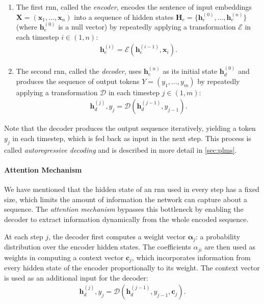 {\begin{enumerate}
    \item The first \ac{rnn}, called the \emph{encoder}, encodes the sentence of input embeddings $\mathbf{X}= (\mathbf{x}_1, \ldots, \mathbf{x}_n)$ into a sequence of hidden states $\mathbf{H}_e = \{\mathbf{h}_e^{(0)}, \ldots, \mathbf{h}_e^{(n)}\}$ (where $\mathbf{h}_e^{(0)}$ is a null vector) by repeatedly applying a transformation $\mathcal{E}$ in each timestep $i\in(1,n)$:
          \begin{align}
              \mathbf{h}_e^{(i)} = \mathcal{E}(\mathbf{h}_e^{(i-1)}, \mathbf{x}_i).
          \end{align}
    \item The second \ac{rnn}, called the \emph{decoder}, uses $\mathbf{h}_e^{(n)}$ as its initial state $\mathbf{h}_d^{(0)}$ and produces the sequence of output tokens  $Y = (y_1, \ldots, y_m)$ by repeatedly applying a transformation $\mathcal{D}$ in each timestep $j\in(1,m)$:
          \begin{align}
              \mathbf{h}_d^{(j)}, y_j = \mathcal{D}(\mathbf{h}_d^{(j-1)}, y_{j-1}).
          \end{align}
\end{enumerate}

Note that the decoder produces the output sequence iteratively, yielding a token $y_j$ in each timestep, which is fed back as input in the next step. This process is called \emph{autoregressive decoding} and is described in more detail in \autoref{sec:plms}.

\paragraph{Attention Mechanism} We have mentioned that the hidden state of an \ac{rnn} used in every step has a fixed size, which limits the amount of information the network can capture about a sequence. The \emph{attention mechanism} \cite{bahdanau2015neural,luong-etal-2015-effective} bypasses this bottleneck by enabling the decoder to extract information dynamically from the whole encoded sequence.

At each step $j$, the decoder first computes a weight vector $\boldsymbol{\alpha}_j$: a probability distribution over the encoder hidden states. The coefficients $\alpha_{ji}$ are then used as weights in computing a context vector $\mathbf{c}_j$, which incorporates information from every hidden state of the encoder proportionally to its weight. The context vector is used as an additional input for the decoder:
\begin{align}
    \mathbf{h}_d^{(j)}, y_j = \mathcal{D}(\mathbf{h}_d^{(j-1)}, y_{j-1}, \mathbf{c}_j).
\end{align}


}
